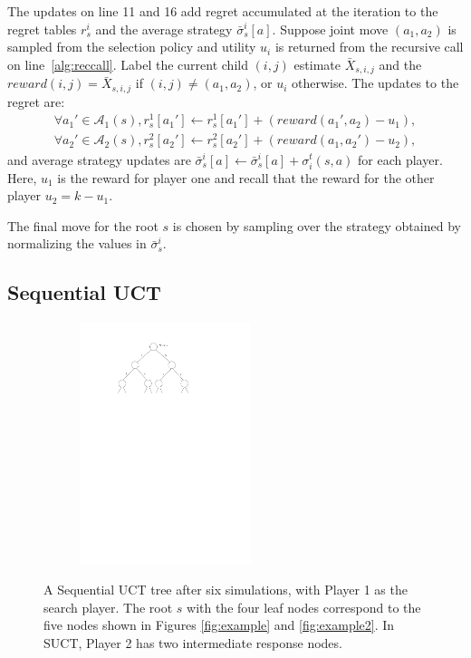 \documentclass[conference]{IEEEtran}
\newcommand{\cA}{\mathcal{A}}
\begin{document}
The updates on line 11 and 16 add regret accumulated at the iteration to  
the regret tables $r^i_s$ and the average strategy $\bar{\sigma}^i_s[a]$. 
Suppose joint move $(a_1,a_2)$ is 
sampled from the selection policy and utility $u_i$ is returned from the recursive call on line~\ref{alg:reccall}. 
Label the current child $(i,j)$ estimate $\bar{X}_{s,i,j}$ and the $reward(i,j) = \bar{X}_{s,i,j}$ if 
$(i,j) \not= (a_1,a_2)$, or $u_i$ otherwise. The updates to the regret are:
\begin{eqnarray*}
\forall a_1' \in \cA_1(s),  r^1_s[a_1'] \leftarrow r^1_s[a_1'] + ( reward(a_1', a_2) - u_1 ),\\
\forall a_2' \in \cA_2(s),  r^2_s[a_2'] \leftarrow r^2_s[a_2'] + ( reward(a_1, a_2') - u_2 ),
\end{eqnarray*}
\noindent and average strategy updates are $\bar{\sigma}^i_s[a] \leftarrow \bar{\sigma}^i_s[a] + \sigma^t_i(s,a)$ 
for each player. Here, $u_1$ is the reward for player one and recall that the reward for the other player $u_2 = k - u_1$.

The final move for the root $s$ is chosen by sampling over the strategy obtained by 
normalizing the values in $\bar{\sigma}_s^i$. 

\subsection{Sequential UCT}

\begin{figure}[b!]
\centering
\begin{subfigure}{5cm}
\centering
\includegraphics[width=5.0cm]{figures/tree4}\\
\end{subfigure}
\caption{A Sequential UCT tree after six simulations, with Player 1 as the search player. The root $s$ with the four 
leaf nodes correspond to the five nodes shown in Figures \ref{fig:example} and \ref{fig:example2}. In SUCT, Player 2 has two intermediate 
response nodes. \label{fig:example3}}
\end{figure}
\end{document}
